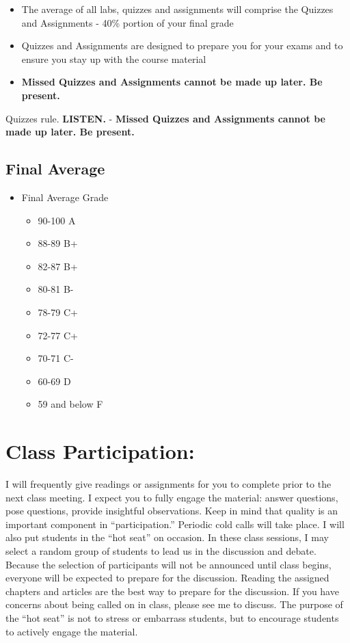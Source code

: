 \documentclass[
]{book}
\providecommand{\tightlist}{%
  \setlength{\itemsep}{0pt}\setlength{\parskip}{0pt}}
\begin{document}
\begin{itemize}
\tightlist
\item
  The average of all labs, quizzes and assignments will comprise the Quizzes and Assignments - 40\% portion of your final grade
\item
  Quizzes and Assignments are designed to prepare you for your exams and to ensure you stay up with the course material
\item
  \textbf{Missed Quizzes and Assignments cannot be made up later. Be present.}
\end{itemize}

Quizzes rule. \textbf{LISTEN.}
- \textbf{Missed Quizzes and Assignments cannot be made up later. Be present.}

\hypertarget{final-average}{%
\subsection{Final Average}\label{final-average}}

\begin{itemize}
\tightlist
\item
  Final Average Grade

  \begin{itemize}
  \tightlist
  \item
    90-100 A
  \item
    88-89 B+
  \item
    82-87 B+
  \item
    80-81 B-
  \item
    78-79 C+
  \item
    72-77 C+
  \item
    70-71 C-
  \item
    60-69 D
  \item
    59 and below F
  \end{itemize}
\end{itemize}

\hypertarget{class-participation}{%
\section{Class Participation:}\label{class-participation}}

I will frequently give readings or assignments for you to complete prior to the next class meeting. I expect you to fully engage the material: answer questions, pose questions, provide insightful observations. Keep in mind that quality is an important component in ``participation.'' Periodic cold calls will take place. I will also put students in the ``hot seat'' on occasion. In these class sessions, I may select a random group of students to lead us in the discussion and debate. Because the selection of participants will not be announced until class begins, everyone will be expected to prepare for the discussion. Reading the assigned chapters and articles are the best way to prepare for the discussion. If you have concerns about being called on in class, please see me to discuss. The purpose of the ``hot seat'' is not to stress or embarrass students, but to encourage students to actively engage the material.
\end{document}
